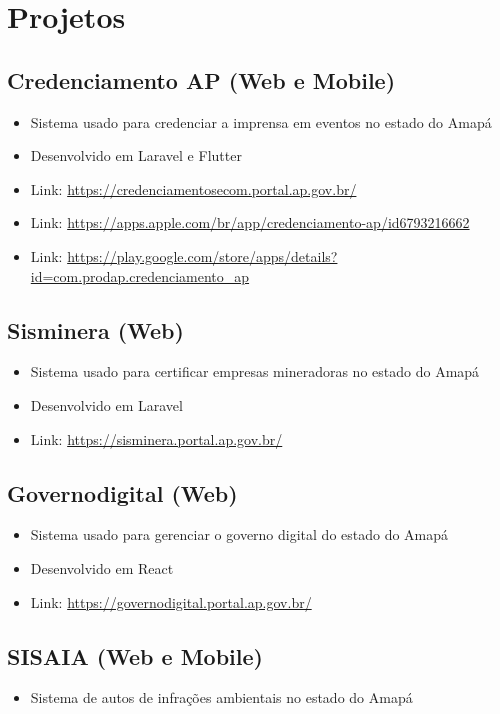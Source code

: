 \documentclass{article}
\begin{document}
\section{\faFlask\enspace Projetos}

\subsection{Credenciamento AP (Web e Mobile)}
\begin{itemize}
  \item Sistema usado para credenciar a imprensa em eventos no estado do Amapá
  \item Desenvolvido em Laravel e Flutter
  \item Link: \url{https://credenciamentosecom.portal.ap.gov.br/}
  \item Link: \url{https://apps.apple.com/br/app/credenciamento-ap/id6793216662}
  \item Link: \url{https://play.google.com/store/apps/details?id=com.prodap.credenciamento_ap}
\end{itemize}

\subsection{Sisminera (Web)}
\begin{itemize}
  \item Sistema usado para certificar empresas mineradoras no estado do Amapá
  \item Desenvolvido em Laravel
  \item Link: \url{https://sisminera.portal.ap.gov.br/}
\end{itemize}

\subsection{Governodigital (Web)}
\begin{itemize}
  \item Sistema usado para gerenciar o governo digital do estado do Amapá
  \item Desenvolvido em React
  \item Link: \url{https://governodigital.portal.ap.gov.br/}
\end{itemize}

\subsection{SISAIA (Web e Mobile)}
\begin{itemize}
  \item Sistema de autos de infrações ambientais no estado do Amapá
\end{itemize}
\end{document}
